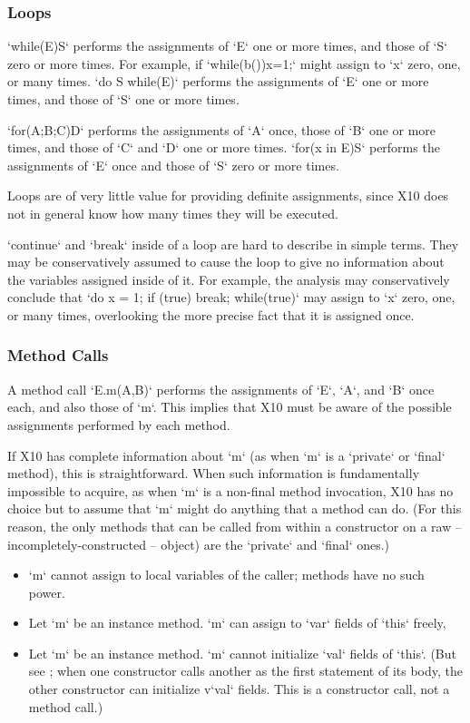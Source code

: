 \subsubsection{Loops}

\xcd`while(E)S` performs the assignments of \xcd`E` one or more times, and
those of \xcd`S` zero or more times.  For example, if \xcd`while(b()){x=1;}`
might assign to \xcd`x` zero, one, or many times.  
\xcd`do S while(E)` performs the assignments of \xcd`E` one or more times, and
those of \xcd`S` one or more times. 

\xcd`for(A;B;C)D` performs the assignments of \xcd`A` once, those of \xcd`B`
one or more times, and those of \xcd`C` and \xcd`D` one or more times.
\xcd`for(x in E)S` performs the assignments of \xcd`E` once and those of
\xcd`S` zero or more times.  

Loops are of very little value for providing definite assignments, since X10
does not in general know how many times they will be executed. 

\xcd`continue` and \xcd`break` inside of a loop are hard to describe in simple
terms.  They may be conservatively assumed to cause the loop to give no
information about the variables assigned inside of it.
For example, the analysis may conservatively conclude that 
\xcd`do{ x = 1; if (true) break; } while(true)` may 
assign to \xcd`x` zero, one, or many times, overlooking the more precise fact
that it is assigned once.  

\subsubsection{Method Calls}

A method call \xcd`E.m(A,B)` performs the assignments of \xcd`E`, \xcd`A`, and
\xcd`B` once each, and also those of \xcd`m`.  This implies that X10 must be
aware of the possible assignments performed by each method.

If X10 has complete information about \xcd`m` (as when \xcd`m` is a
\xcd`private` or \xcd`final` method), this is straightforward.  When such
information is fundamentally impossible to acquire, as when \xcd`m` is a
non-final method invocation, X10 has no choice but to assume that \xcd`m`
might do anything that a method can do.    (For this reason, the only methods
that can be called from within a constructor on a raw --
incompletely-constructed -- object) are the \xcd`private` and
\xcd`final` ones.)  
\begin{itemize}
\item \xcd`m` cannot assign to local variables of the caller; methods have no
      such power.
\item Let \xcd`m` be an instance method. \xcd`m` can assign to \xcd`var` fields of \xcd`this` freely,
\item Let \xcd`m` be an instance method. \xcd`m` cannot initialize \xcd`val` fields of \xcd`this`.  (But see
      ; when one constructor calls another as the
      first statement of its body, the other constructor can initialize
      v\xcd`val` fields. This is a constructor call, not a method call.) 
\end{itemize}

